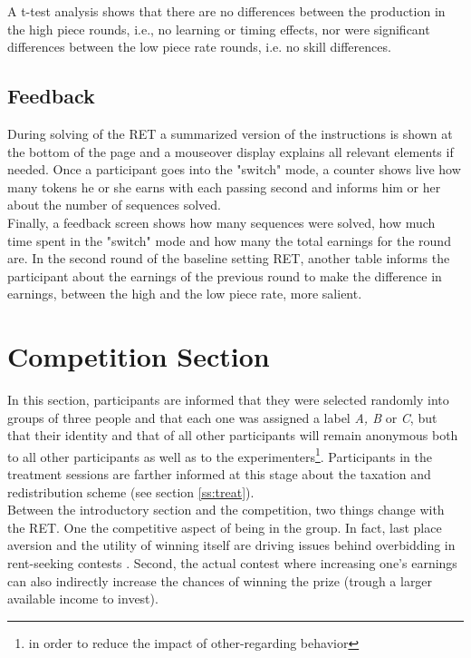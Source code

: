     A t-test analysis shows that there are no differences between the production in the high piece rounds, i.e., no learning or timing effects, nor were significant differences between the low piece rate rounds, i.e. no skill differences.
    
    \subsection{Feedback}
    
    During solving of the RET a summarized version of the instructions is shown at the bottom of the page and a mouseover display explains all relevant elements if needed. Once a participant goes into the "switch" mode, a counter shows live how many tokens he or she earns with each passing second and informs him or her about the number of sequences solved.\\
    
    Finally, a feedback screen shows how many sequences were solved, how much time spent in the "switch" mode and how many the total earnings for the round are. In the second round of the baseline setting RET, another table informs the participant about the earnings of the previous round to make the difference in earnings, between the high and the low piece rate, more salient.
    
    \section{Competition Section}
    \label{ss:compt}
    
    In this section, participants are informed that they were selected randomly into groups of three people and that each one was assigned a label \textit{A, B} or \textit{C}, but that their identity and that of all other participants will remain anonymous both to all other participants as well as to the experimenters\footnote{in order to reduce the impact of other-regarding behavior}. Participants in the treatment sessions are farther informed at this stage about the taxation and redistribution scheme (see section \ref{ss:treat}).\\
    
    Between the introductory section and the competition, two things change with the RET. One the competitive aspect of being in the group. In fact, last place aversion and the utility of winning itself are driving issues behind overbidding in rent-seeking contests \citep{sheremeta2013}. Second, the actual contest where increasing one's earnings can also indirectly increase the chances of winning the prize (trough a larger available income to invest).\\
    
